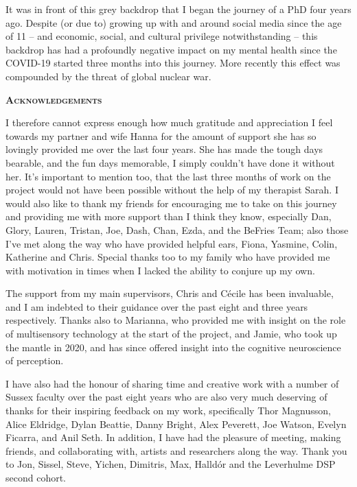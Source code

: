 It was in front of this grey backdrop that I began the journey of a PhD four years ago. Despite (or due to) growing up with and around social media since the age of 11 -- and economic, social, and cultural privilege notwithstanding -- this backdrop has had a profoundly negative impact on my mental health since the COVID-19 started three months into this journey. More recently this effect was compounded by the threat of global nuclear war.
\clearpage

{}
\begin{flushleft}
	\Huge \textsc{\textbf{Acknowledgements}}
	
\end{flushleft}

\noindent I therefore cannot express enough how much gratitude and appreciation I feel towards my partner and wife Hanna for the amount of support she has so lovingly provided me over the last four years. She has made the tough days bearable, and the fun days memorable, I simply couldn't have done it without her. It's important to mention too, that the last three months of work on the project would not have been possible without the help of my therapist Sarah. I would also like to thank my friends for encouraging me to take on this journey and providing me with more support than I think they know, especially Dan, Glory, Lauren, Tristan, Joe, Dash, Chan, Ezda, and the BeFries Team; also those I've met along the way who have provided helpful ears, Fiona, Yasmine, Colin, Katherine and Chris. Special thanks too to my family who have provided me with motivation in times when I lacked the ability to conjure up my own.

The support from my main supervisors, Chris and C\'ecile has been invaluable, and I am indebted to their guidance over the past eight and three years respectively. Thanks also to Marianna, who provided me with insight on the role of multisensory technology at the start of the project, and Jamie, who took up the mantle in 2020, and has since offered insight into the cognitive neuroscience of perception.

I have also had the honour of sharing time and creative work with a number of Sussex faculty over the past eight years who are also very much deserving of thanks for their inspiring feedback on my work, specifically Thor Magnusson, Alice Eldridge, Dylan Beattie, Danny Bright, Alex Peverett, Joe Watson, Evelyn Ficarra, and Anil Seth. In addition, I have had the pleasure of meeting, making friends, and collaborating with, artists and researchers along the way. Thank you to Jon, Sissel, Steve, Yichen, Dimitris, Max, Halld\'or and the Leverhulme DSP second cohort.

